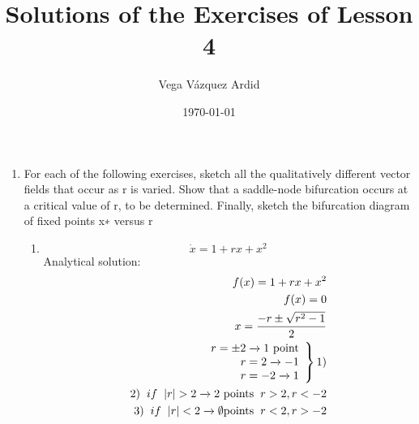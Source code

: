 \documentclass[a4paper,10pt]{article}
\title{Solutions of the Exercises of Lesson 4}
\author{Vega Vázquez Ardid}
\date{\today}
\begin{document}
\maketitle

\begin{enumerate}
    \item
    For each of the following exercises, sketch all the qualitatively different vector fields that occur as r is varied. Show that a saddle-node bifurcation occurs at a critical value of r, to be determined. Finally, sketch the bifurcation diagram of fixed points x∗ versus r
        \begin{enumerate}
            \item 
                \begin{equation}
                    \Dot{x}= 1 + rx + x^{2}
                \end{equation}
                Analytical solution:
                \begin{equation}
                    \begin{aligned}
                        f(x)= 1 + rx + x^{2}\\
                        f(x)=0\\
                        x= \frac{-r  \pm \sqrt{r^{2}-1}}{2}\\
                        \left.
                        \begin{array}{rcl}
                            r= \pm 2 \xrightarrow{} \text{1 point} \\
                            r= 2 \xrightarrow{} -1\\
                            r= -2 \xrightarrow{} 1\\
                        \end{array}
                        \right\}
                        1)\\
                        2) \hspace{0.2cm}if \hspace{0.2cm}\abs{r}> 2 \xrightarrow{} \text{2 points}\hspace{0.2cm} r >2 , r<-2\\
                        3)\hspace{0.2cm} if \hspace{0.2cm}\abs{r}<2 \xrightarrow{} \emptyset \text{points}\hspace{0.2cm} r<2, r>-2\\ 
                    

\end{aligned}
\end{equation}
\end{enumerate}
\end{enumerate}
\end{document}
